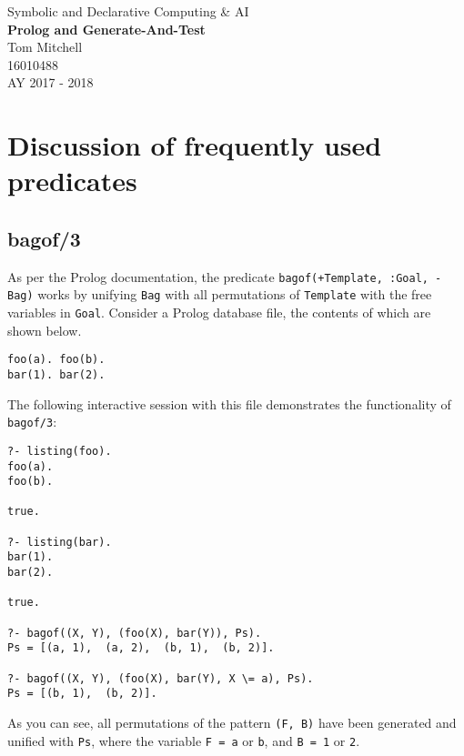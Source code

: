\documentclass[11pt]{article}
\begin{document}
\begin{titlepage}
\begin{center}

\huge{Symbolic and Declarative Computing \& AI} \\
\Huge{\textbf{Prolog and Generate-And-Test}} \\


\vfill
\LARGE{Tom Mitchell} \\
\LARGE{16010488} \\
\LARGE{AY 2017 - 2018}

\end{center}
\end{titlepage}


\tableofcontents
\newpage

\section{Discussion of frequently used predicates}
\subsection{bagof/3}
As per the Prolog documentation, the predicate {\verb|bagof(+Template, :Goal, -Bag)|} works by unifying {\verb|Bag|} with all permutations of {\verb|Template|} with the free variables in {\verb|Goal|}. Consider a Prolog database file, the contents of which are shown below.
\begin{verbatim}
foo(a). foo(b).
bar(1). bar(2).
\end{verbatim}

The following interactive session with this file demonstrates the functionality of {\verb|bagof/3|}:
\begin{verbatim}
?- listing(foo).
foo(a).
foo(b).

true.

?- listing(bar).
bar(1).
bar(2).

true.

?- bagof((X, Y), (foo(X), bar(Y)), Ps).
Ps = [(a, 1),  (a, 2),  (b, 1),  (b, 2)].

?- bagof((X, Y), (foo(X), bar(Y), X \= a), Ps).
Ps = [(b, 1),  (b, 2)].
\end{verbatim}

As you can see, all permutations of the pattern {\verb|(F, B)|} have been generated and unified with {\verb|Ps|}, where the variable {\verb|F = a|} or {\verb|b|}, and  {\verb|B = 1|} or {\verb|2|}.  \\
\end{document}
